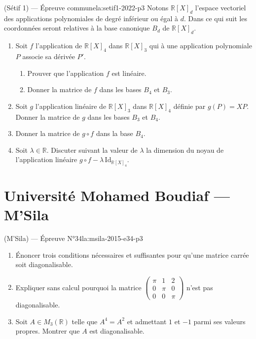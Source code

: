 \newpage

\begin{problem}{(Sétif 1) — Épreuve commune}{la:setif1-2022-p3}
Notons $\mathbb{R}[X]_d$ l'espace vectoriel des applications polynomiales de degré
inférieur ou égal à $d$. Dans ce qui suit les coordonnées seront relatives à la
base canonique $B_d$ de $\mathbb{R}[X]_d$.
\begin{enumerate}
\item Soit $f$ l'application de $\mathbb{R}[X]_4$ dans $\mathbb{R}[X]_3$ qui à une
      application polynomiale $P$ associe sa dérivée $P'$.
      \begin{enumerate}
      \item Prouver que l'application $f$ est linéaire.
      \item Donner la matrice de $f$ dans les bases $B_4$ et $B_3$.
      \end{enumerate}
\item Soit $g$ l'application linéaire de $\mathbb{R}[X]_3$ dans $\mathbb{R}[X]_4$
      définie par $g(P) = XP$. Donner la matrice de $g$ dans les bases $B_3$ et
      $B_4$.
\item Donner la matrice de $g \circ f$ dans la base $B_4$.
\item Soit $\lambda \in \mathbb{R}$. Discuter suivant la valeur de $\lambda$ la
      dimension du noyau de l'application linéaire
      $g \circ f - \lambda \, \mathrm{Id}_{\mathbb{R}[X]_4}$.
\end{enumerate}

\end{problem}

\newpage

\section{Université Mohamed Boudiaf --- M'Sila}

\begin{problem}{(M'Sila) — Épreuve N°34}{la:msila-2015-e34-p3}
\begin{enumerate}
\item Énoncer trois conditions nécessaires et suffisantes pour qu'une matrice carrée
      soit diagonalisable.
\item Expliquer sans calcul pourquoi la matrice
      $\begin{pmatrix}\pi&1&2\\0&\pi&0\\0&0&\pi\end{pmatrix}$
      n'est pas diagonalisable.
\item Soit $A\in M_3(\mathbb{R})$ telle que $A^4=A^2$ et admettant $1$ et $-1$ parmi
      ses valeurs propres. Montrer que $A$ est diagonalisable.
\end{enumerate}

\end{problem}

